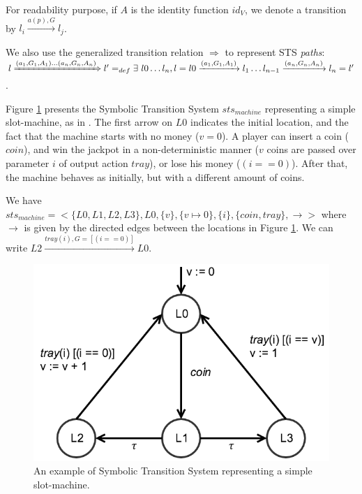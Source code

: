 For readability purpose, if $A$ is the identity function $id_V$,
we denote a transition by $l_i \xrightarrow{a(p),G} l_j$.

We also use the generalized transition relation $\Rightarrow$ to
represent STS \emph{paths}:\\ $l \xRightarrow{(a_1,G_1,A_1) \dots
(a_n,G_n,A_n)} l' =_{def} \exists ~l0 \dots l_n, l=l0
\xrightarrow{(a_1,G_1,A_1)} l_1 \dots
l_{n-1} \xrightarrow{(a_n,G_n,A_n)} l_n = l'$.

\begin{example}
    Figure \ref{fig:sts-example} presents the Symbolic Transition
    System $sts_{machine}$ representing a simple slot-machine, as
    in \cite{FTW05}. The first arrow on $L0$ indicates the
    initial location, and the fact that the machine starts with
    no money ($v = 0$). A player can insert a coin ($coin$), and
    win the jackpot in a non-deterministic manner ($v$ coins are
    passed over parameter $i$ of output action $tray$), or lose
    his money ($(i == 0)$). After that, the machine behaves as
    initially, but with a different amount of coins.

    We have $sts_{machine} = <\{L0, L1, L2, L3\}, L0, \{ v \}, \{
    v \mapsto 0 \}, \{ i \}, \{ coin, tray \}, \rightarrow >$
    where $\rightarrow$ is given by the directed edges between
    the locations in Figure \ref{fig:sts-example}.  We can write
    $L2 \xrightarrow{tray(i), G = [(i == 0)]} L0$.

    \begin{figure}[ht]
        \begin{center}
            \includegraphics[width=0.7\linewidth]{figures/sts-example.png}
        \end{center}

        \caption{An example of Symbolic Transition System
        representing a simple slot-machine.}
        \label{fig:sts-example}
    \end{figure}

    \label{example:sts}
\end{example}

